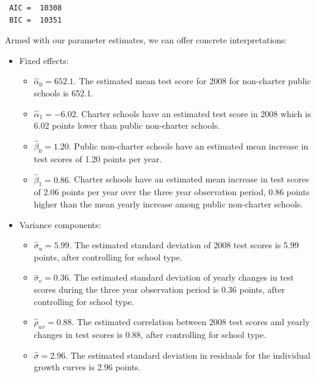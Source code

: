 \documentclass[
]{krantz}
\providecommand{\tightlist}{%
  \setlength{\itemsep}{0pt}\setlength{\parskip}{0pt}}
\begin{document}
\begin{verbatim}
 AIC =  10308 
 BIC =  10351 
\end{verbatim}

Armed with our parameter estimates, we can offer concrete interpretations:

\begin{itemize}
\item
  Fixed effects:

  \begin{itemize}
  \tightlist
  \item
    \(\hat{\alpha}_{0} = 652.1.\) The estimated mean test score for 2008 for non-charter public schools is 652.1.
  \item
    \(\hat{\alpha}_{1}= -6.02.\) Charter schools have an estimated test score in 2008 which is 6.02 points lower than public non-charter schools.
  \item
    \(\hat{\beta}_{0}= 1.20.\) Public non-charter schools have an estimated mean increase in test scores of 1.20 points per year.
  \item
    \(\hat{\beta}_{1}= 0.86.\) Charter schools have an estimated mean increase in test scores of 2.06 points per year over the three year observation period, 0.86 points higher than the mean yearly increase among public non-charter schools.
  \end{itemize}
\item
  Variance components:

  \begin{itemize}
  \tightlist
  \item
    \(\hat{\sigma}_u= 5.99.\) The estimated standard deviation of 2008 test scores is 5.99 points, after controlling for school type.
  \item
    \(\hat{\sigma}_v= 0.36.\) The estimated standard deviation of yearly changes in test scores during the three year observation period is 0.36 points, after controlling for school type.
  \item
    \(\hat{\rho}_{uv}= 0.88.\) The estimated correlation between 2008 test scores and yearly changes in test scores is 0.88, after controlling for school type.
  \item
    \(\hat{\sigma}= 2.96.\) The estimated standard deviation in residuals for the individual growth curves is 2.96 points.
  \end{itemize}
\end{itemize}
\end{document}
